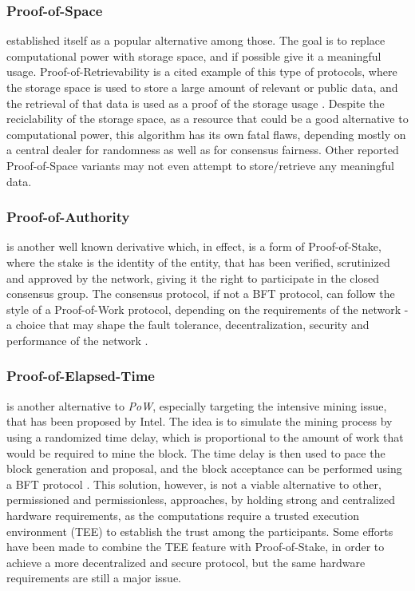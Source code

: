 \documentclass[journal]{IEEEtran}
\begin{document}
\subsubsection{Proof-of-Space} established itself as a popular alternative among those.
The goal is to replace computational power with storage space,
and if possible give it a meaningful usage. Proof-of-Retrievability is
a cited example of this type of protocols, where the storage space is
used to store a large amount of relevant or public data, and the retrieval of that data
is used as a proof of the storage usage \cite{juels2007pors}. Despite the reciclability 
of the storage space, as a resource that could be a good alternative
to computational power, this algorithm has its own fatal flaws, depending
mostly on a central dealer for randomness as well as for consensus fairness.
Other reported Proof-of-Space variants may not even attempt to store/retrieve any meaningful data.

\subsubsection{Proof-of-Authority} is another well known derivative
which, in effect, is a form of Proof-of-Stake, where the stake is the 
identity of the entity, that has been verified, scrutinized and
approved by the network, giving it the right to participate in the
closed consensus group. The consensus protocol, if not a BFT protocol, 
can follow the style of a Proof-of-Work protocol, depending on the 
requirements of the network - a choice that may shape the fault tolerance,
decentralization, security and performance of the network \cite{survey-dist-consensus}.

\subsubsection{Proof-of-Elapsed-Time} is another alternative to \emph{PoW},
especially targeting the intensive mining issue, that has been proposed 
by Intel. The idea is to simulate the mining process by using a
randomized time delay, which is proportional to the amount of work
that would be required to mine the block. The time delay is then used to pace the
block generation and proposal, and the block acceptance can be performed
using a BFT protocol \cite{olson2018sawtooth}. This solution, however,
is not a viable alternative to other, permissioned and permissionless, approaches, 
by holding strong and centralized hardware requirements, 
as the computations require a trusted execution environment
(TEE) to establish the trust among the participants. Some efforts have been made
to combine the TEE feature with Proof-of-Stake, in order to achieve a
more decentralized and secure protocol, but the 
same hardware requirements are still a major issue.
\end{document}
